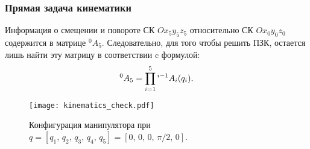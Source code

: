 \subsubsection{Прямая задача кинематики}\label{part_kinematics_forward}
Информация о смещении и повороте СК $Ox_5y_5z_5$ относительно СК $Ox_0y_0z_0$ содержится в матрице ${}^0A_5$.
Следовательно, для того чтобы решить ПЗК, остается лишь найти эту матрицу в соответствии c формулой:
\begin{equation}\label{fk}
	{}^0A_5 = \prod^{5}_{i=1}{{}^{i-1}A_i(q_i)}\ldotp
\end{equation}

\begin{figure}[h]
	\centering
	\texttt{[image: kinematics\_check.pdf]}
	\caption{Конфигурация манипулятора при $q=\left[q_1,\,q_2,\,q_3,\,q_4,\,q_5\right] = \left[0,\,0,\,0,\,\pi/2,\,0\right]$.}
	\label{kinematics_check}
\end{figure}

